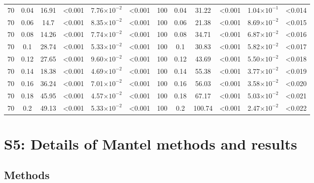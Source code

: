 \documentclass[12pt]{article}
\begin{document}
\begin{table}[hb!]
\begin{tabular}{c c | c c| c c ||c c | c c | c c |}
            70  & 0.04  & 16.91 & \textless0.001  & 7.76$\times10^{-2}$ & \textless0.001  & 100 & 0.04  & 31.22 & \textless0.001  & 1.04$\times10^{-1}$ & \textless0.014  \\
            70  & 0.06  & 14.7  & \textless0.001  & 8.35$\times10^{-2}$ & \textless0.001  & 100 & 0.06  & 21.38 & \textless0.001  & 8.69$\times10^{-2}$ & \textless0.015  \\
            70  & 0.08  & 14.26 & \textless0.001  & 7.74$\times10^{-2}$ & \textless0.001  & 100 & 0.08  & 34.71 & \textless0.001  & 6.87$\times10^{-2}$ & \textless0.016  \\
            70  & 0.1 & 28.74 & \textless0.001  & 5.33$\times10^{-2}$ & \textless0.001  & 100 & 0.1 & 30.83 & \textless0.001  & 5.82$\times10^{-2}$ & \textless0.017  \\
            70  & 0.12  & 27.65 & \textless0.001  & 9.60$\times10^{-2}$ & \textless0.001  & 100 & 0.12  & 43.69 & \textless0.001  & 5.50$\times10^{-2}$ & \textless0.018  \\
            70  & 0.14  & 18.38 & \textless0.001  & 4.69$\times10^{-2}$ & \textless0.001  & 100 & 0.14  & 55.38 & \textless0.001  & 3.77$\times10^{-2}$ & \textless0.019  \\
            70  & 0.16  & 36.24 & \textless0.001  & 7.01$\times10^{-2}$ & \textless0.001  & 100 & 0.16  & 56.03 & \textless0.001  & 3.58$\times10^{-2}$ & \textless0.020  \\
            70  & 0.18  & 45.95 & \textless0.001  & 4.57$\times10^{-2}$ & \textless0.001  & 100 & 0.18  & 67.17 & \textless0.001  & 5.03$\times10^{-2}$ & \textless0.021  \\
            70  & 0.2 & 49.13 & \textless0.001  & 5.33$\times10^{-2}$ & \textless0.001  & 100 & 0.2 & 100.74  & \textless0.001  & 2.47$\times10^{-2}$ & \textless0.022  \\
        \hline
	    \end{tabular}
	    \end{table}


\clearpage

\section*{S5: Details of Mantel methods and results}

	\subsection*{Methods}
\end{document}

